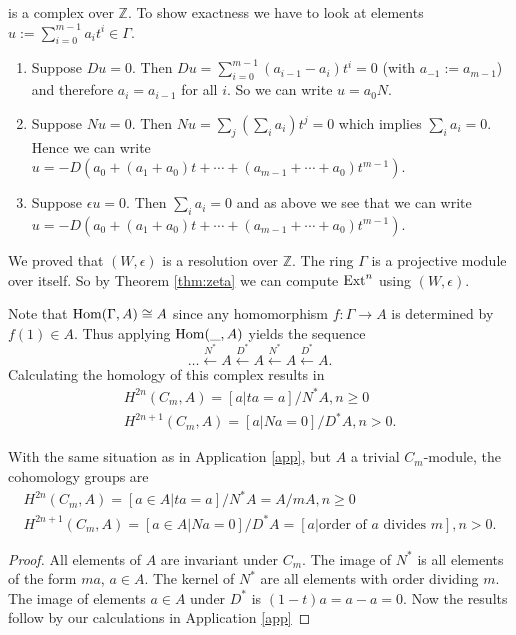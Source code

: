 is a complex over $\mathbb{Z}$.
To show exactness we have to look at elements $u:=\sum_{i=0}^{m-1}a_i t^i\in \Gamma$.
\begin{enumerate}
\item
Suppose $Du=0$.
Then $Du = \sum_{i=0}^{m-1}(a_{i-1}-a_{i})t^i = 0$ (with $a_{-1}:=a_{m-1}$) and therefore $a_i = a_{i-1}$ for all $i$.
So we can write $u=a_0 N$.
\item
Suppose $Nu=0$.
Then $Nu = \sum_j \left( \sum_i a_i\right)t^j = 0$ which implies $\sum_i a_i = 0$.
Hence we can write $u = -D (a_0 + (a_1+a_0)t + \cdots + (a_{m-1}+\cdots+a_0)t^{m-1})$.
\item
Suppose $\epsilon u = 0$. Then $\sum_i a_i = 0$ and as above we see that we can write $u=  -D (a_0 + (a_1+a_0)t + \cdots + (a_{m-1}+\cdots+a_0)t^{m-1})$.
\end{enumerate}
We proved that $(W,\epsilon)$ is a resolution over $\mathbb{Z}$.
The ring $\Gamma$ is a projective module over itself.
So by Theorem \ref{thm:zeta} we can compute $\operatorname{Ext}^{n}$ using $(W,\epsilon)$.

Note that $\operatorname{Hom}(\Gamma,A)\cong A$ since any homomorphism $f:\Gamma \to A$ is determined by $f(1)\in A$. 
Thus applying $\operatorname{Hom}(\_,A)$ yields the sequence
\begin{equation*}
\dots \xleftarrow{N^*} A \xleftarrow{D^*} A \xleftarrow{N^*} A \xleftarrow{D^*} A.
\end{equation*}
Calculating the homology of this complex results in
\begin{gather*}
H^{2n}(C_m, A) = [a|ta = a]/N^* A, n \geq 0\\
H^{2n+1}(C_m, A) =[a|Na = 0]/D^* A, n > 0.
\end{gather*}
\begin{example}
With the same situation as in Application \ref{app}, but $A$ a trivial $C_m$-module, the cohomology groups are
\begin{gather*}
H^{2n}(C_m, A) = [a\in A|ta = a]/N^* A = A / mA, n \geq 0\\
H^{2n+1}(C_m, A) =[a \in A|Na = 0]/D^* A = [a|\text{order of $a$ divides $m$}], n > 0.
\end{gather*}
\end{example}
\begin{proof}
All elements of $A$ are invariant under $C_m$.
The image of $N^*$ is all elements of the form $ma$, $a\in A$.
The kernel of $N^*$ are all elements with order dividing $m$.
The image of elements $a\in A$ under $D^*$ is $(1-t)a = a - a = 0$.
Now the results follow by our calculations in Application \ref{app}
\end{proof}
